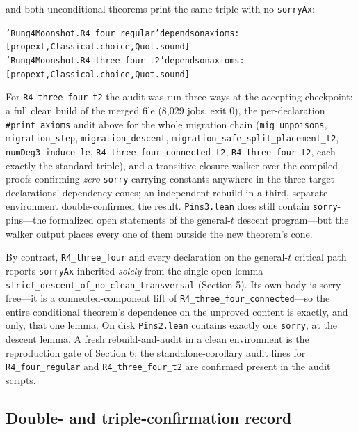 \documentclass[11pt]{article}
\theoremstyle{definition}
\theoremstyle{remark}
\begin{document}
\noindent and both unconditional theorems print the same triple with no \texttt{sorryAx}:

{\small
\begin{alltt}
'Rung4Moonshot.R4_four_regular' depends on axioms:
  [propext, Classical.choice, Quot.sound]
'Rung4Moonshot.R4_three_four_t2' depends on axioms:
  [propext, Classical.choice, Quot.sound]
\end{alltt}
}

\noindent For \texttt{R4\_three\_four\_t2} the audit was run three ways at the accepting checkpoint: a full clean build of the merged file (8{,}029 jobs, exit 0), the per-declaration \texttt{\#print axioms} audit above for the whole migration chain (\texttt{mig\_unpoisons}, \texttt{migration\_step}, \texttt{migration\_descent}, \texttt{migration\_safe\_split\_placement\_t2}, \texttt{numDeg3\_induce\_le}, \texttt{R4\_three\_four\_connected\_t2}, \texttt{R4\_three\_four\_t2}, each exactly the standard triple), and a transitive-closure walker over the compiled proofs confirming \emph{zero} \texttt{sorry}-carrying constants anywhere in the three target declarations' dependency cones; an independent rebuild in a third, separate environment double-confirmed the result. \texttt{Pins3.lean} does still contain \texttt{sorry}-pins---the formalized open statements of the general-$t$ descent program---but the walker output places every one of them outside the new theorem's cone.

By contrast, \texttt{R4\_three\_four} and every declaration on the general-$t$ critical path reports \texttt{sorryAx} inherited \emph{solely} from the single open lemma \texttt{strict\_descent\_of\_no\_clean\_transversal} (Section 5). Its own body is sorry-free---it is a connected-component lift of \texttt{R4\_three\_four\_connected}---so the entire conditional theorem's dependence on the unproved content is exactly, and only, that one lemma. On disk \texttt{Pins2.lean} contains exactly one \texttt{sorry}, at the descent lemma. A fresh rebuild-and-audit in a clean environment is the reproduction gate of Section 6; the standalone-corollary audit lines for \texttt{R4\_four\_regular} and \texttt{R4\_three\_four\_t2} are confirmed present in the audit scripts.

\subsection{Double- and triple-confirmation record}\label{34-confirmation}
\end{document}
